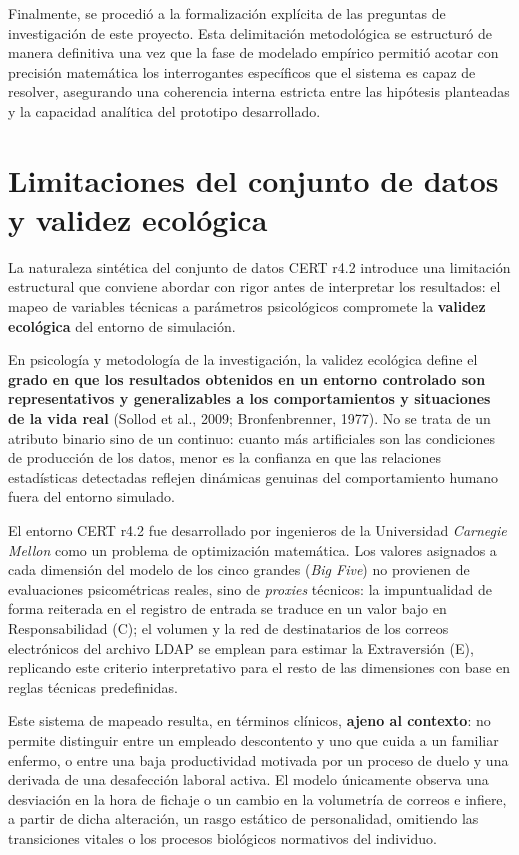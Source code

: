 \documentclass[IB]{TFUOC}%
\begin{document}
\medskip
\noindent Finalmente, se procedió a la formalización explícita de las preguntas de investigación de este proyecto. Esta delimitación metodológica se estructuró de manera definitiva una vez que la fase de modelado empírico permitió acotar con precisión matemática los interrogantes específicos que el sistema es capaz de resolver, asegurando una coherencia interna estricta entre las hipótesis planteadas y la capacidad analítica del prototipo desarrollado.

\section{Limitaciones del conjunto de datos y validez ecológica}
La naturaleza sintética del conjunto de datos CERT r4.2 introduce una limitación estructural que conviene abordar con rigor antes de interpretar los resultados: el mapeo de variables técnicas a parámetros psicológicos compromete la \textbf{validez ecológica} del entorno de simulación.

\medskip
\noindent En psicología y metodología de la investigación, la validez ecológica define el \textbf{grado en que los resultados obtenidos en un entorno controlado son representativos y generalizables a los comportamientos y situaciones de la vida real} (Sollod et al., 2009; Bronfenbrenner, 1977). No se trata de un atributo binario sino de un continuo: cuanto más artificiales son las condiciones de producción de los datos, menor es la confianza en que las relaciones estadísticas detectadas reflejen dinámicas genuinas del comportamiento humano fuera del entorno simulado.

\medskip
\noindent El entorno CERT r4.2 fue desarrollado por ingenieros de la Universidad \textit{Carnegie Mellon} como un problema de optimización matemática. Los valores asignados a cada dimensión del modelo de los cinco grandes (\textit{Big Five}) no provienen de evaluaciones psicométricas reales, sino de \textit{proxies} técnicos: la impuntualidad de forma reiterada en el registro de entrada se traduce en un valor bajo en Responsabilidad (C); el volumen y la red de destinatarios de los correos electrónicos del archivo LDAP se emplean para estimar la Extraversión (E), replicando este criterio interpretativo para el resto de las dimensiones con base en reglas técnicas predefinidas.

\medskip
\noindent Este sistema de mapeado resulta, en términos clínicos, \textbf{ajeno al contexto}: no permite distinguir entre un empleado descontento y uno que cuida a un familiar enfermo, o entre una baja productividad motivada por un proceso de duelo y una derivada de una desafección laboral activa. El modelo únicamente observa una desviación en la hora de fichaje o un cambio en la volumetría de correos e infiere, a partir de dicha alteración, un rasgo estático de personalidad, omitiendo las transiciones vitales o los procesos biológicos normativos del individuo.
\end{document}
